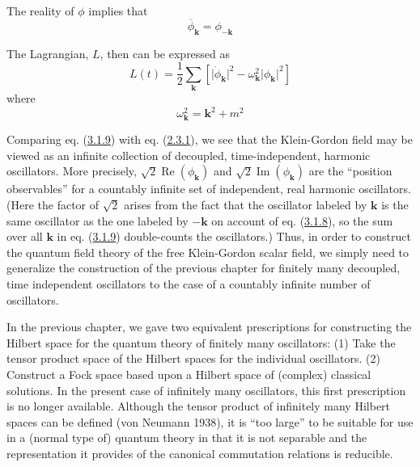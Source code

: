 \documentclass[11pt,a4paper]{article}
\begin{document}
\hypertarget{source-46}{}

The reality of \(\phi\) implies that
\begin{equation*}
\overline{\phi}_{\mathbf{k}} = \phi_{-\mathbf{k}} \tag{3.1.8}\label{eq:3.1.8}
\end{equation*}

The Lagrangian, \(L\), then can be expressed as
\begin{equation*}
L(t)=\frac12\sum_{\mathbf{k}}[\lvert\dot\phi_{\mathbf{k}}\rvert^2-\omega_{\mathbf{k}}^2\lvert\phi_{\mathbf{k}}\rvert^2] \tag{3.1.9}\label{eq:3.1.9}
\end{equation*}
where
\begin{equation*}
\omega_{\mathbf{k}}^2=\mathbf{k}^2+m^2 \tag{3.1.10}\label{eq:3.1.10}
\end{equation*}

Comparing eq. (\hyperref[eq:3.1.9]{3.1.9}) with eq. (\hyperref[eq:2.3.1]{2.3.1}), we see that the Klein-Gordon field may be viewed as an infinite collection of decoupled, time-independent, harmonic oscillators. More precisely, \(\sqrt2\operatorname{Re}(\phi_{\mathbf{k}})\) and \(\sqrt2\operatorname{Im}(\phi_{\mathbf{k}})\) are the ``position observables'' for a countably infinite set of independent, real harmonic oscillators. (Here the factor of \(\sqrt{2}\) arises from the fact that the oscillator labeled by \(\mathbf{k}\) is the same oscillator as the one labeled by \(-\mathbf{k}\) on account of eq. (\hyperref[eq:3.1.8]{3.1.8}), so the sum over all \(\mathbf{k}\) in eq. (\hyperref[eq:3.1.9]{3.1.9}) double-counts the oscillators.) Thus, in order to construct the quantum field theory of the free Klein-Gordon scalar field, we simply need to generalize the construction of the previous chapter for finitely many decoupled, time independent oscillators to the case of a countably infinite number of oscillators.

In the previous chapter, we gave two equivalent prescriptions for constructing the Hilbert space for the quantum theory of finitely many oscillators: (1) Take the tensor product space of the Hilbert spaces for the individual oscillators. (2) Construct a Fock space based upon a Hilbert space of (complex) classical solutions. In the present case of infinitely many oscillators, this first prescription is no longer available. Although the tensor product of infinitely many Hilbert spaces can be defined (von Neumann 1938), it is ``too large'' to be suitable for use in a (normal type of) quantum theory in that it is not separable and the representation it provides of the canonical commutation relations is reducible.
\end{document}
